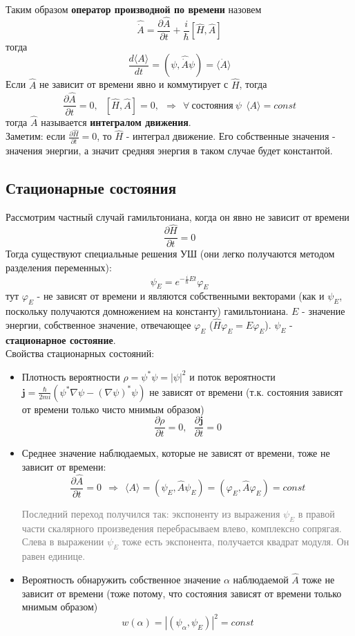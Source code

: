 		Таким образом \textbf{оператор производной по времени} назовем
		$$
			\hat{\dot{A}} = \frac{\partial\hat{A}}{\partial t} + \frac{i}{\hbar}\left[\hat{H},\hat{A}\right]
		$$
		тогда 
		$$
			\frac{d\langle A\rangle}{dt} = \left(\psi,\hat{\dot{A}}\psi\right) = \langle \dot{A}\rangle
		$$
		Если $\hat{A}$ не зависит от времени явно и коммутирует с $\hat{H}$, тогда
		$$
			\frac{\partial\hat{A}}{\partial t} = 0, \ \ \ \left[\hat{H},\hat{A}\right] = 0, \ \ \Rightarrow \ \ \forall \ \text{состояния} \ \psi \ \ \langle A\rangle = const
		$$
		тогда $\hat{A}$ называется \textbf{интегралом движения}.\\
		Заметим: если $\frac{\partial\hat{H}}{\partial t} = 0$, то $\hat{H}$ - интеграл движение. Его собственные значения - значения энергии, а значит средняя энергия в таком случае будет константой.
	\subsection{Стационарные состояния}
		Рассмотрим частный случай гамильтониана, когда он явно не зависит от времени
		$$
			\frac{\partial\hat{H}}{\partial t} = 0
		$$
		Тогда существуют специальные решения УШ (они легко получаются методом разделения переменных):
		$$
			\psi_E = e^{-\frac{i}{\hbar}Et}\varphi_E
		$$
		тут $\varphi_E$ - не зависят от времени и являются собственными векторами (как и $\psi_E$, поскольку получаются домножением на константу) гамильтониана. $E$ - значение энергии, собственное значение, отвечающее $\varphi_E$ ($\hat{H}\varphi_E = E\varphi_E$). $\psi_E$ - \textbf{стационарное состояние}.\\
		Свойства стационарных состояний:
		\begin{itemize}
			\item 
				Плотность вероятности $\rho = \psi^{*}\psi = |\psi|^2$ и поток вероятности $\textbf{j} = \frac{\hbar}{2mi}(\psi^{*}\nabla \psi - (\nabla \psi)^{*}\psi)$ не зависят от времени (т.к. состояния зависят от времени только чисто мнимым образом)
				$$
					\frac{\partial\rho}{\partial t} = 0, \ \ \ \frac{\partial\textbf{j}}{\partial t} = 0
				$$
			\item 
				Среднее значение наблюдаемых, которые не зависят от времени, тоже не зависит от времени:
				$$
					\frac{\partial \hat{A}}{\partial t} = 0 \ \ \Rightarrow \ \ \langle A\rangle = (\psi_E,\hat{A}\psi_E) = (\varphi_E, \hat{A}\varphi_E) = const
				$$
				\begin{scriptsize}
				\begin{spacing}{0.3}
				\textcolor{gray}{
					Последний переход получился так: экспоненту из выражения $\psi_E$ в правой части скалярного произведения перебрасываем влево, комплексно сопрягая. Слева в выражении $\psi_E$ тоже есть экспонента, получается квадрат модуля. Он равен единице.
				}	
				\end{spacing}
				\end{scriptsize}	 
			\item
				Вероятность обнаружить собственное значение $\alpha$ наблюдаемой $\hat{A}$ тоже не зависит от времени (тоже потому, что состояния зависят от времени только мнимым образом)
				$$
					w(\alpha) = |(\psi_{\alpha},\psi_E)|^2 = const
				$$
			\end{itemize}
